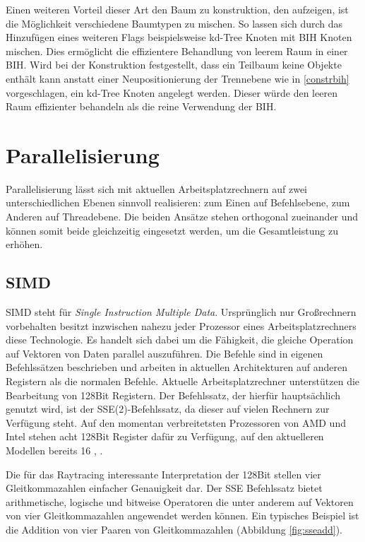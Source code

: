 Einen weiteren Vorteil dieser Art den Baum zu konstruktion, den \cite{WK07} aufzeigen, ist die Möglichkeit verschiedene Baumtypen zu mischen. So lassen sich durch das Hinzufügen eines weiteren Flags beispielsweise kd-Tree Knoten mit BIH Knoten mischen. Dies ermöglicht die effizientere Behandlung von leerem Raum in einer BIH. Wird bei der Konstruktion festgestellt, dass ein Teilbaum keine Objekte enthält kann anstatt einer Neupositionierung der Trennebene wie in \ref{constrbih} vorgeschlagen, ein kd-Tree Knoten angelegt werden. Dieser würde den leeren Raum effizienter behandeln als die reine Verwendung der BIH.

\section{Parallelisierung}

Parallelisierung lässt sich mit aktuellen Arbeitsplatzrechnern auf zwei unterschiedlichen Ebenen sinnvoll realisieren: zum Einen auf Befehlsebene, zum Anderen auf Threadebene. Die beiden Ansätze stehen orthogonal zueinander und können somit beide gleichzeitig eingesetzt werden, um die Gesamtleistung zu erhöhen.

\subsection{SIMD}

SIMD steht für \textit{Single Instruction Multiple Data}. Ursprünglich nur Großrechnern vorbehalten besitzt inzwischen nahezu jeder Prozessor eines Arbeitsplatzrechners diese Technologie. Es handelt sich dabei um die Fähigkeit, die gleiche Operation auf Vektoren von Daten parallel auszuführen.
Die Befehle sind in eigenen Befehlssätzen beschrieben und arbeiten in aktuellen Architekturen auf anderen Registern als die normalen Befehle. Aktuelle Arbeitsplatzrechner unterstützen die Bearbeitung von 128Bit Registern. Der Befehlssatz, der hierfür hauptsächlich genutzt wird, ist der SSE(2)-Befehlssatz, da dieser auf vielen Rechnern zur Verfügung steht. Auf den momentan verbreitetsten Prozessoren von AMD und Intel stehen acht 128Bit Register dafür zu Verfügung, auf den aktuelleren Modellen bereits 16 \cite{AMD06}, 
\cite{Intel08}.

Die für das Raytracing interessante Interpretation der 128Bit stellen vier Gleitkommazahlen einfacher Genauigkeit dar. 
Der SSE Befehlssatz bietet arithmetische, logische und bitweise Operatoren die unter anderem auf Vektoren von vier Gleitkommazahlen angewendet werden können. Ein typisches Beispiel ist die Addition von vier Paaren von Gleitkommazahlen (Abbildung \ref{fig:sseadd}). 

